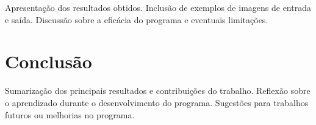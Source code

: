 \documentclass[english, 
               brazil, 
               bsc] %
               {dcomp-abntex2}
\begin{document}
Apresentação dos resultados obtidos.
Inclusão de exemplos de imagens de entrada e saída.
Discussão sobre a eficácia do programa e eventuais limitações.


\chapter{Conclusão}

Sumarização dos principais resultados e contribuições do trabalho.
Reflexão sobre o aprendizado durante o desenvolvimento do programa.
Sugestões para trabalhos futuros ou melhorias no programa.









\postextual


\renewcommand{\chapnumfont}{\chaptitlefont}
\renewcommand{\afterchapternum}{}
% 
% 
\end{document}
